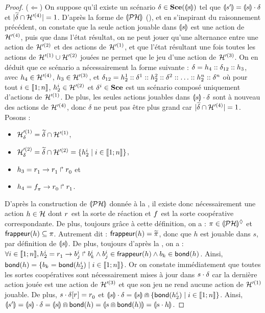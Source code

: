 \begin{proof}
  ($\Leftarrow$) On suppose qu'il existe un scénario $\delta \in \Sce(\tophp{s})$
    tel que $\tophp{s'} = \tophp{s} \play \delta$ et $\card{\toset{\delta} \cap \PHh'^{(4)}} = 1$.
    D'après la forme de $\phmtophp$ (),
    et en s'inspirant du raisonnement précédent,
    on constate que la seule action jouable dans $\tophp{s}$ est une action de $\PHh'^{(4)}$,
    puis que dans l'état résultat, on ne peut jouer
    qu'une alternance entre une action de $\PHh'^{(2)}$ et des actions de $\PHh'^{(1)}$,
    et que l'état résultant une fois toutes les actions de $\PHh'^{(1)} \cup \PHh'^{(2)}$
    jouées ne permet que le jeu d'une action de $\PHh'^{(3)}$.
    On en déduit que ce scénario a nécessairement la forme suivante :
    $\delta = h_4 \cons \delta_{12} \cons h_3$,
    avec $h_4 \in \PHh'^{(4)}$, $h_3 \in \PHh'^{(3)}$, et
    $\delta_{12} = h_2^1 \cons \delta^1 \cons h_2^2 \cons \delta^2 \cons
      \ldots \cons h_2^n \cons \delta^n$
    où pour tout $i \in \segm{1}{n}$, $h_2^i \in \PHh'^{(2)}$
    et $\delta^i \in \Sce$ est un scénario composé uniquement d'actions de $\PHh'^{(1)}$.
    De plus, les seules actions jouables dans $\tophp{s} \play \delta$ sont à nouveau des actions
    de $\PHh'^{(4)}$, donc $\delta$ ne peut pas être plus grand car
    $\card{\toset{\delta} \cap \PHh'^{(4)}} = 1$.
    Posons :
    \begin{itemize}
      \item $\PHh'^{(1)}_\delta = \toset{\delta} \cap \PHh'^{(1)}$,
      \item $\PHh'^{(2)}_\delta = \toset{\delta} \cap \PHh'^{(2)}
        = \{ h_2^i \mid i \in \segm{1}{n} \}$,
      \item $h_3 = \PHhit{\sr{}_1}{\sr{}_1}{\sr{}_0}$ et
      \item $h_4 = \PHhit{\scf{}_\mypi}{\sr{}_0}{\sr{}_1}$.
    \end{itemize}
    D'après la construction de $\phmtophp$ donnée à la ,
    il existe donc nécessairement une action $h \in \PHh$
    dont $\sr{}$ est la sorte de réaction et $\scf{}$ est la sorte coopérative correspondante.
    De plus, toujours grâce à cette définition, on a :
    $\mypi \in \PHsubl[\phmtophp]$ et $\frappeur{h} \subseteq \mypi$.
    Autrement dit : $\frappeur{h} = \toset{\mypi}$,
    donc que $h$ est jouable dans $s$, par définition de $\tophp{s}$.
    De plus, toujours d'après la , on a :
    $\forall i \in \segm{1}{n}, h_2^i = \PHfrappe{\sr{}_1}{b_j^i}{b_k^i}
      \wedge b_j^i \in \frappeur{h} \wedge b_k \in \bond{h}$.
    Ainsi, $\bond{h} = \{ b_k = \bond{h_2^i} \mid i \in \segm{1}{n} \}$.
    Or on constate immédiatement que toutes les sortes coopératives sont nécessairement
    mises à jour
    dans $s \play \delta$ car la dernière action jouée est une action de $\PHh'^{(3)}$
    et que son jeu ne rend aucune action de $\PHh'^{(1)}$ jouable.
    De plus, $\PHget{s \play \delta}{\sr{}} = \sr{}_0$ et
    $\tophp{s} \play \delta = \tophp{s} \recouvre \{ \bond{h_2^i} \mid i \in \segm{1}{n} \}$.
    Ainsi, $\tophp{s'} = \tophp{s} \play \delta = \tophp{s} \recouvre \bond{h}
      = \tophp{s \recouvre \bond{h}} = \tophp{s \play h}$.
\end{proof}



